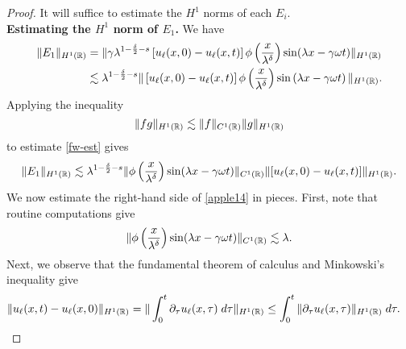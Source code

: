 \begin{proof}
    It will suffice to estimate the $H^1$ norms of each $E_i$. \vspace{0.25cm}\\
{\bf Estimating the $H^1$ norm of $\hyperref[all_errors_together]{E_1}$.} 
We have
%
%
\begin{equation}
\label{fw-est}
\begin{split}
\|E_1\|_{H^1(\mathbb{R})}
& = \| \gamma \lambda^{1 -\frac{\delta}{2}-s} \left[ u_\ell(x,0) - u_\ell(x,t) \right]
\phi\left( \frac{x}{\lambda^\delta}
\right ) \sin (\lambda x - \gamma \omega t )\|_{H^1(\mathbb{R})}
\\
& \lesssim \lambda^{1 -\frac{\delta}{2} -s } \|\left[ u_\ell(x,0) - 
u_\ell(x,t)
\right] \phi\left( \frac{x}{\lambda^\delta} \right )
\sin\left( \lambda x - \gamma \omega t
\right) \|_{H^1(\mathbb{R})}.
\end{split}
\end{equation}
%
%
Applying the inequality 
%
%
\begin{equation*}
\label{applec}
\|fg\|_{H^1(\mathbb{R})} \lesssim \|f\|_{C^1(\mathbb{R})} \|g\|_{H^1(\mathbb{R})}
\end{equation*}
%
%
%
%
%
%
%
%
to estimate \eqref{fw-est} gives
%
%
\begin{equation}
\begin{split}
\|E_1\|_{H^1(\mathbb{R})} \lesssim \lambda^{1 - \frac{\delta}{2} -s } \|\phi
\left( \frac{x}{\lambda^\delta} \right) \sin (\lambda x - \gamma \omega t)
\|_{C^1(\mathbb{R})} \|[u_\ell (x,0) - u_\ell (x,t) ] \|_{H^1(\mathbb{R})}.
\label{apple14}
\end{split}
\end{equation}
%
%
We now estimate the right-hand side of \eqref{apple14} in pieces. First, 
note that routine computations give
%
%
\begin{equation}
\begin{split}
\|\phi\left( \frac{x}{\lambda^\delta} \right) \sin(\lambda x - \gamma 
\omega t)
\|_{C^1(\mathbb{R})}
\lesssim \lambda.
\label{apple15}
\end{split}
\end{equation}
%
%
Next, we observe that the fundamental 
theorem
of calculus and Minkowski's inequality give
%
%
%
%
\begin{equation}
\begin{split}
\|u_\ell(x,t) - u_\ell(x,0)\|_{H^1(\rr)}
& =  \| \int_0^t \p_\tau
u_\ell(x,\tau) \; d \tau \|_{H^1(\rr)}
\le \int_0^t \|\p_\tau u_\ell (x,\tau) \|_{H^1(\rr)} \; d \tau.
\label{apple100}
\end{split}

\end{equation}
\end{proof}
